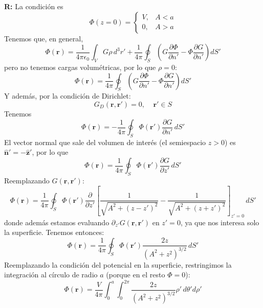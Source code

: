 \documentclass[]{article}
\numberwithin{equation}{section}
\newcommand{\0}{\textcolor{gray}{0}}
\newcommand{\rv}{\mathbf{r}}
\newcommand{\zv}{\mathbf{z}}
\newcommand{\zhat}{\hat{\zv}}
\newcommand{\nhat}{\hat{\mathbf{n}}}
\newcommand{\eo}{\epsilon_{0}}
\begin{document}
\begin{enumerate}
\begin{enumerate}
		\textbf{R:} La condición es
		\begin{equation*}
			\Phi(z = 0) = \left\lbrace \begin{matrix}
				V, & A < a\\
				0, & A > a
			\end{matrix}\right.
		\end{equation*}
		Tenemos que, en general,
		\begin{equation*}
			\Phi(\rv) = \frac{1}{4\pi\eo}\int_{V}G\rho\, d^3r' + \frac{1}{4\pi}\oint_{S}\left( G\frac{\partial\Phi}{\partial n'} - \Phi\frac{\partial G}{\partial n'} \right)dS'
		\end{equation*}
		pero no tenemos cargas volumétricas, por lo que \(\rho = 0\):
		\begin{equation*}
			\Phi(\rv) = \frac{1}{4\pi}\oint_{S}\left( G\frac{\partial\Phi}{\partial n'} - \Phi\frac{\partial G}{\partial n'} \right)dS'
		\end{equation*}
		Y además, por la condición de Dirichlet:
		\begin{equation*}
			G_{D}(\rv,\rv') = 0, ~~~~~\rv'\in S
		\end{equation*}
		Tenemos
		\begin{equation*}
			\Phi(\rv) = -\frac{1}{4\pi}\oint_{S}\Phi(\rv') \frac{\partial G}{\partial n'}\, dS'
		\end{equation*}
		El vector normal que sale del volumen de interés (el semiespacio \(z > 0\)) es \(\nhat' = -\zhat'\), por lo que
		\begin{equation*}
			\Phi(\rv) = \frac{1}{4\pi}\oint_{S}\Phi(\rv') \frac{\partial G}{\partial z'}\, dS'
		\end{equation*}
		Reemplazando \(G(\rv,\rv')\):
		\begin{equation*}
			\Phi(\rv) = \frac{1}{4\pi}\oint_{S}\Phi(\rv') \frac{\partial}{\partial z'}\left[\frac{1}{\sqrt{A^2 + (z - z')^2}} - \frac{1}{\sqrt{A^2 + (z + z')^2}}\right]_{z'=0}\, dS'
		\end{equation*}
		donde además estamos evaluando \(\partial_{z'}G(\rv,\rv')\) en \(z' = 0\), ya que nos interesa solo la superficie. Tenemos entonces:
		\begin{equation*}
			\Phi(\rv) = \frac{1}{4\pi}\oint_{S}\Phi(\rv') \frac{2 z}{(A^2 + z^2)^{3/2}}\, dS'
		\end{equation*}
		Reemplazando la condición del potencial en la superficie, restringimos la integración al círculo de radio \(a\) (porque en el resto \(\Phi = 0\)):
		\begin{equation*}
			\Phi(\rv) = \frac{V}{4\pi}\int_{0}^{a}\int_{0}^{2\pi} \frac{2 z}{(A^2 + z^2)^{3/2}}\rho'\, d\theta' d\rho'

\end{equation*}
\end{enumerate}
\end{enumerate}
\end{document}
